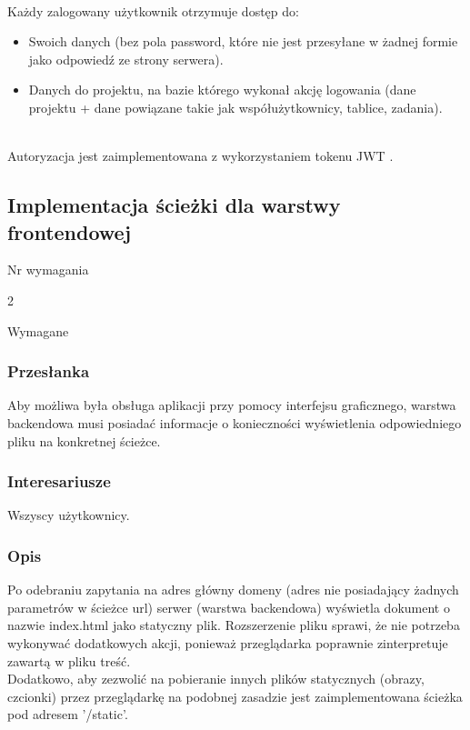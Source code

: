 \documentclass[eng,printmode]{mgr}
\begin{document}
\ \\
Każdy zalogowany użytkownik otrzymuje dostęp do:
\begin{itemize}
  \item[--] Swoich danych (bez pola password, które nie jest przesyłane w żadnej formie jako odpowiedź ze strony serwera).
  \item[--] Danych do projektu, na bazie którego wykonał akcję logowania (dane projektu + dane powiązane takie jak współużytkownicy, tablice, zadania).
\end{itemize}
\ \\
Autoryzacja jest zaimplementowana z wykorzystaniem tokenu JWT \cite{Keyword_JWTToken}.

\subsection{Implementacja ścieżki dla warstwy frontendowej}
\begin{labeling}{Nr wymagania}
\item [Nr wymagania:] 2
\item [Priorytet:] Wymagane
\end{labeling}

\subsubsection{Przesłanka}
Aby możliwa była obsługa aplikacji przy pomocy interfejsu graficznego, warstwa backendowa musi posiadać informacje o konieczności wyświetlenia odpowiedniego pliku na konkretnej ścieżce.


\subsubsection{Interesariusze}
Wszyscy użytkownicy.

\subsubsection{Opis}
Po odebraniu zapytania na adres główny domeny (adres nie posiadający żadnych parametrów w ścieżce url) serwer (warstwa backendowa) wyświetla dokument o nazwie index.html jako statyczny plik. Rozszerzenie pliku sprawi, że nie potrzeba wykonywać dodatkowych akcji, ponieważ przeglądarka poprawnie zinterpretuje zawartą w pliku treść. \\
Dodatkowo, aby zezwolić na pobieranie innych plików statycznych (obrazy, czcionki) przez przeglądarkę na podobnej zasadzie jest zaimplementowana ścieżka pod adresem '/static'.
\end{document}
